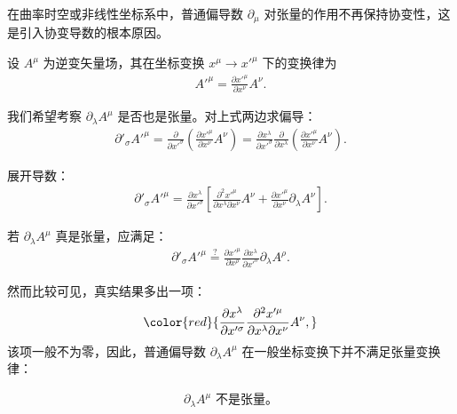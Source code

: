 \begin{derivationnote}[普通导数不是张量]
在曲率时空或非线性坐标系中，普通偏导数 $\partial_\mu$ 对张量的作用不再保持协变性，这是引入协变导数的根本原因。

设 $A^{\mu}$ 为逆变矢量场，其在坐标变换 $x^{\mu} \to x'^{\mu}$ 下的变换律为
\begin{align}
A'^{\mu} = \frac{\partial x'^{\mu}}{\partial x^{\nu}} A^{\nu}.
\end{align}

我们希望考察 $\partial_\lambda A^{\mu}$ 是否也是张量。对上式两边求偏导：
\begin{align}
\partial'_{\sigma} A'^{\mu}
= \frac{\partial}{\partial x'^{\sigma}}
\left( \frac{\partial x'^{\mu}}{\partial x^{\nu}} A^{\nu} \right)
= \frac{\partial x^{\lambda}}{\partial x'^{\sigma}}
\frac{\partial}{\partial x^{\lambda}}
\left( \frac{\partial x'^{\mu}}{\partial x^{\nu}} A^{\nu} \right).
\end{align}

展开导数：
\begin{align}
\partial'_{\sigma} A'^{\mu}
= \frac{\partial x^{\lambda}}{\partial x'^{\sigma}}
\left[
\frac{\partial^2 x'^{\mu}}{\partial x^{\lambda} \partial x^{\nu}} A^{\nu}
+ \frac{\partial x'^{\mu}}{\partial x^{\nu}} \partial_{\lambda} A^{\nu}
\right].
\end{align}

若 $\partial_\lambda A^{\mu}$ 真是张量，应满足：
\begin{align}
\partial'_{\sigma} A'^{\mu}
\stackrel{?}{=}
\frac{\partial x'^{\mu}}{\partial x^{\rho}}
\frac{\partial x^{\lambda}}{\partial x'^{\sigma}}
\partial_{\lambda} A^{\rho}.
\end{align}

然而比较可见，真实结果多出一项：
\begin{align}
\color{red}{
\frac{\partial x^{\lambda}}{\partial x'^{\sigma}}
\frac{\partial^2 x'^{\mu}}{\partial x^{\lambda} \partial x^{\nu}} A^{\nu},
}
\end{align}
该项一般不为零，因此，普通偏导数 $\partial_\lambda A^{\mu}$ 在一般坐标变换下并不满足张量变换律：

\begin{align}
\boxed{
\partial_\lambda A^{\mu} \text{ 不是张量。}
}
\end{align}
\end{derivationnote}


